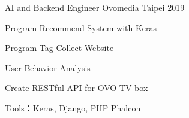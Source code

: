 

\begin{cventries}

  \cventry
    {AI and Backend Engineer} %
    {Ovomedia} %
    {Taipei} %
    {2019} %
    {
      \begin{cvitems} %
        \item {Program Recommend System with Keras}
        \item {Program Tag Collect Website}
        \item {User Behavior Analysis}
        \item {Create RESTful API for OVO TV box}
        \item {Tools：Keras, Django, PHP Phalcon}
      \end{cvitems}
    }

\end{cventries}
